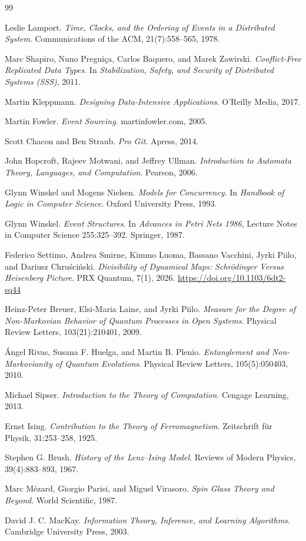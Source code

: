 \documentclass[12pt]{article}
\begin{document}
\begin{thebibliography}{99}

Leslie Lamport.
\textit{Time, Clocks, and the Ordering of Events in a Distributed System}.
Communications of the ACM, 21(7):558--565, 1978.

Marc Shapiro, Nuno Preguiça, Carlos Baquero, and Marek Zawirski.
\textit{Conflict-Free Replicated Data Types}.
In \textit{Stabilization, Safety, and Security of Distributed Systems (SSS)}, 2011.

Martin Kleppmann.
\textit{Designing Data-Intensive Applications}.
O’Reilly Media, 2017.

Martin Fowler.
\textit{Event Sourcing}.
martinfowler.com, 2005.

Scott Chacon and Ben Straub.
\textit{Pro Git}.
Apress, 2014.

John Hopcroft, Rajeev Motwani, and Jeffrey Ullman.
\textit{Introduction to Automata Theory, Languages, and Computation}.
Pearson, 2006.

Glynn Winskel and Mogens Nielsen.
\textit{Models for Concurrency}.
In \textit{Handbook of Logic in Computer Science}. Oxford University Press, 1993.

Glynn Winskel.
\textit{Event Structures}.
In \textit{Advances in Petri Nets 1986}, Lecture Notes in Computer Science 255:325--392.
Springer, 1987.

Federico Settimo, Andrea Smirne, Kimmo Luoma, Bassano Vacchini,
Jyrki Piilo, and Dariusz Chru\'sci\'nski.
\textit{Divisibility of Dynamical Maps: Schr{\"o}dinger Versus Heisenberg Picture}.
PRX Quantum, 7(1), 2026.
\url{https://doi.org/10.1103/6dt2-sq44}

Heinz-Peter Breuer, Elsi-Maria Laine, and Jyrki Piilo.
\textit{Measure for the Degree of Non-Markovian Behavior of Quantum Processes in Open Systems}.
Physical Review Letters, 103(21):210401, 2009.

Ángel Rivas, Susana F. Huelga, and Martin B. Plenio.
\textit{Entanglement and Non-Markovianity of Quantum Evolutions}.
Physical Review Letters, 105(5):050403, 2010.

Michael Sipser.
\textit{Introduction to the Theory of Computation}.
Cengage Learning, 2013.

Ernst Ising.
\textit{Contribution to the Theory of Ferromagnetism}.
Zeitschrift für Physik, 31:253--258, 1925.

Stephen G. Brush.
\textit{History of the Lenz–Ising Model}.
Reviews of Modern Physics, 39(4):883--893, 1967.

Marc Mézard, Giorgio Parisi, and Miguel Virasoro.
\textit{Spin Glass Theory and Beyond}.
World Scientific, 1987.

David J. C. MacKay.
\textit{Information Theory, Inference, and Learning Algorithms}.
Cambridge University Press, 2003.

\end{thebibliography}
\end{document}
